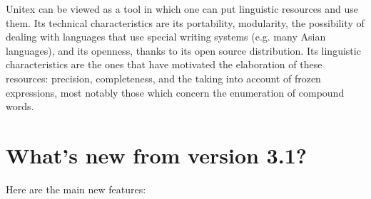 \bigskip
\noindent Unitex can be viewed as a tool in which one can put linguistic resources
and use them. Its technical characteristics are its portability,  modularity,
the possibility of dealing with languages that use special writing systems (e.g. many
Asian languages), and its openness, thanks to its open source distribution. Its
linguistic characteristics are the ones that have motivated the elaboration of
these resources: precision, completeness, and the taking into account of frozen
expressions, most notably those which concern the enumeration of compound words.


\section*{What's new from version 3.1?}
Here are the main new features:
